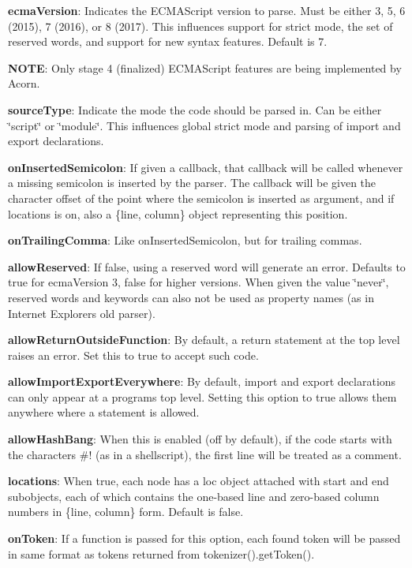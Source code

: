 \begin{DoxyItemize}
\item {\bfseries ecma\+Version}\+: Indicates the E\+C\+M\+A\+Script version to parse. Must be either 3, 5, 6 (2015), 7 (2016), or 8 (2017). This influences support for strict mode, the set of reserved words, and support for new syntax features. Default is 7.

{\bfseries N\+O\+TE}\+: Only \textquotesingle{}stage 4\textquotesingle{} (finalized) E\+C\+M\+A\+Script features are being implemented by Acorn.
\item {\bfseries source\+Type}\+: Indicate the mode the code should be parsed in. Can be either {\ttfamily \char`\"{}script\char`\"{}} or {\ttfamily \char`\"{}module\char`\"{}}. This influences global strict mode and parsing of {\ttfamily import} and {\ttfamily export} declarations.
\item {\bfseries on\+Inserted\+Semicolon}\+: If given a callback, that callback will be called whenever a missing semicolon is inserted by the parser. The callback will be given the character offset of the point where the semicolon is inserted as argument, and if {\ttfamily locations} is on, also a {\ttfamily \{line, column\}} object representing this position.
\item {\bfseries on\+Trailing\+Comma}\+: Like {\ttfamily on\+Inserted\+Semicolon}, but for trailing commas.
\item {\bfseries allow\+Reserved}\+: If {\ttfamily false}, using a reserved word will generate an error. Defaults to {\ttfamily true} for {\ttfamily ecma\+Version} 3, {\ttfamily false} for higher versions. When given the value {\ttfamily \char`\"{}never\char`\"{}}, reserved words and keywords can also not be used as property names (as in Internet Explorer\textquotesingle{}s old parser).
\item {\bfseries allow\+Return\+Outside\+Function}\+: By default, a return statement at the top level raises an error. Set this to {\ttfamily true} to accept such code.
\item {\bfseries allow\+Import\+Export\+Everywhere}\+: By default, {\ttfamily import} and {\ttfamily export} declarations can only appear at a program\textquotesingle{}s top level. Setting this option to {\ttfamily true} allows them anywhere where a statement is allowed.
\item {\bfseries allow\+Hash\+Bang}\+: When this is enabled (off by default), if the code starts with the characters {\ttfamily \#!} (as in a shellscript), the first line will be treated as a comment.
\item {\bfseries locations}\+: When {\ttfamily true}, each node has a {\ttfamily loc} object attached with {\ttfamily start} and {\ttfamily end} subobjects, each of which contains the one-\/based line and zero-\/based column numbers in {\ttfamily \{line, column\}} form. Default is {\ttfamily false}.
\item {\bfseries on\+Token}\+: If a function is passed for this option, each found token will be passed in same format as tokens returned from {\ttfamily tokenizer().get\+Token()}.


\end{DoxyItemize}
